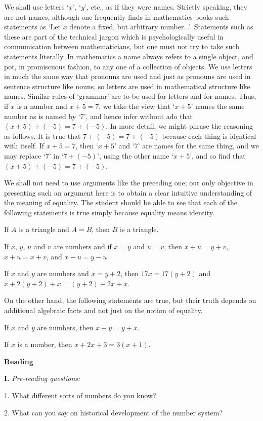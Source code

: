 \documentclass[a4paper]{article}
\newcounter{EUnits}
\newcommand{\EUnit}{\par\medskip{\huge \textbf{Unit \arabic{EUnits}}}\par\stepcounter{EUnits}}
\newcommand{\ESect}[1]{\medskip\par{\large \textbf{#1}}\par}
\newcommand{\ETask}[2]{\medskip\par\textbf{#1.} \textit{#2}\par}
\begin{document}
We shall use letters `$x$', `$y$', etc., as if they were names. Strictly speaking, they are not names, although one
frequently finds in mathematics books such statements as `Let $x$ denote a fixed, but arbitrary number...'. Statements
such as these are part of the technical jargon which is psychologically useful in communication between mathematicians,
but one must not try to take such statements literally. In mathematics a name always refers to a single object, and pot,
in promiscuous fashion, to any one of a collection of objects. We use letters in much the same way that pronouns are used
and just as pronouns are used in sentence structure like nouns, so letters are used in mathematical structure like names.
Similar rules of `grammar' are to be used for letters and for names. Thus, if $x$ is a number and $x+5=7$, we take the
view that `$x+5$' names the same number as is named by `7', and hence infer without ado that $(x+5)+(-5)=7+(-5)$. In more
detail, we might phrase the reasoning as follows. It is true that $7+(-5)=7+(-5)$ because each thing is identical with
itself. If $x+5=7$, then `$x+5$' and `7' are names for the same thing, and we may replace `7' in `$7+(-5)$', using the
other name `$x+5$', and so find that $(x+5)+(-5)=7+(-5)$.

We shall not need to use arguments like the preceding one; our only objective in presenting such an argument here is to
obtain a clear intuitive understanding of the meaning of equality. The student should be able to see that each of the
following statements is true simply because equality means identity.

If $A$ is a triangle and $A=B$, then $B$ is a triangle.

If $x$, $y$, $u$ and $v$ are numbers and if $x=y$ and $u=v$, then $x+u=y+v$, $x+u=x+v$, and $x-u=y-u$.

If $x$ and $y$ are numbers and $x=y+2$, then $17x=17(y+2)$ and $x+2(y+2)+x=(y+2)+2x+x$.

On the other hand, the following statements are true, but their truth depends on additional algebraic facts and not just
on the notion of equality.

If $x$ and $y$ are numbers, then $x+y=y+x$.

If $x$ is a number, then $x+2x+3=3(x+1)$.

\EUnit
\ESect{Reading}
\ETask{I}{Pre-reading questions:}
1. What different sorts of numbers do you know?

2. What can you say on historical development of the number system?
\end{document}
